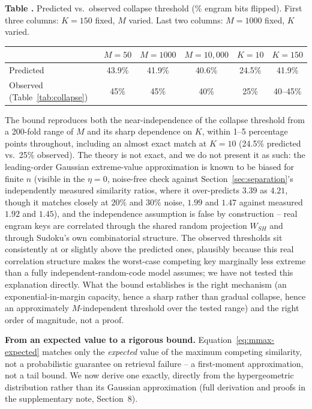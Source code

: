 \documentclass[11pt]{article}
\newcommand{\toprule}{\hline\hline}
\newcommand{\midrule}{\hline}
\newcommand{\bottomrule}{\hline\hline}
\begin{document}
\label{tab:capacity-theory}
\noindent\textbf{Table \thetable.} Predicted vs.\ observed collapse threshold (\% engram bits flipped). First
three columns: $K{=}150$ fixed, $M$ varied. Last two columns: $M{=}1000$ fixed, $K$ varied.
\begin{center}
\begin{tabular}{lccccc}
\toprule
 & $M{=}50$ & $M{=}1000$ & $M{=}10{,}000$ & $K{=}10$ & $K{=}150$ \\
\midrule
Predicted & 43.9\% & 41.9\% & 40.6\% & 24.5\% & 41.9\% \\
Observed (Table~\ref{tab:collapse}) & 45\% & 45\% & 40\% & 25\% & 40--45\% \\
\bottomrule
\end{tabular}
\end{center}

The bound reproduces both the near-independence of the collapse threshold from a 200-fold range
of $M$ and its sharp dependence on $K$, within 1--5 percentage points throughout, including an
almost exact match at $K{=}10$ (24.5\% predicted vs.\ 25\% observed). The theory is not exact,
and we do not present it as such: the leading-order Gaussian extreme-value approximation is
known to be biased for finite $n$ (visible in the $\eta{=}0$, noise-free check against
Section~\ref{sec:separation}'s independently measured similarity ratios, where it over-predicts
$3.39$ as $4.21$, though it matches closely at $20\%$ and $30\%$ noise, $1.99$ and $1.47$ against
measured $1.92$ and $1.45$), and the independence assumption is false by construction -- real
engram keys are correlated through the shared random projection $W_{SH}$ and through Sudoku's
own combinatorial structure. The observed thresholds sit consistently at or slightly above the
predicted ones, plausibly because this real correlation structure makes the worst-case
competing key marginally less extreme than a fully independent-random-code model assumes; we
have not tested this explanation directly. What the bound establishes is the right mechanism
(an exponential-in-margin capacity, hence a sharp rather than gradual collapse, hence an
approximately $M$-independent threshold over the tested range) and the right order of magnitude,
not a proof.

\textbf{From an expected value to a rigorous bound.} Equation~\ref{eq:mmax-expected} matches
only the \emph{expected} value of the maximum competing similarity, not a probabilistic
guarantee on retrieval failure -- a first-moment approximation, not a tail bound. We now derive
one exactly, directly from the hypergeometric distribution rather than its Gaussian
approximation (full derivation and proofs in the supplementary note, Section~8).
\end{document}
